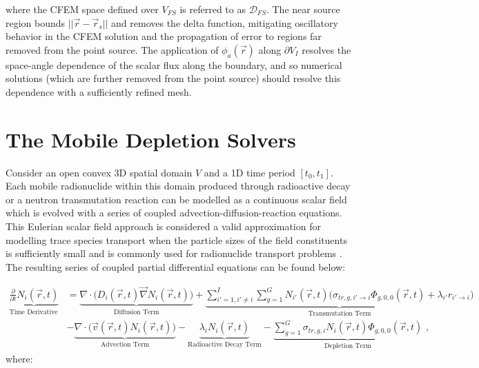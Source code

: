 where the CFEM space defined over $V_{FS}$ is referred to as $\mathcal{D}_{FS}$. The near source region bounds $||\vec{r} - \vec{r}_{s}||$ and removes the delta function, mitigating oscillatory behavior in the CFEM solution and the propagation of error to regions far removed from the point source. The application of $\phi_{a}(\vec{r})$ along $\partial V_{I}$ resolves the space-angle dependence of the scalar flux along the boundary, and so numerical solutions (which are further removed from the point source) should resolve this dependence with a sufficiently refined mesh. 

\section{The Mobile Depletion Solvers}
\label{solver:depletion}

Consider an open convex 3D spatial domain $V$ and a 1D time period $[t_{0}, t_{1}]$. Each mobile radionuclide within this domain produced through radioactive decay or a neutron transmutation reaction can be modelled as a continuous scalar field which is evolved with a series of coupled advection-diffusion-reaction equations. This Eulerian scalar field approach is considered a valid approximation for modelling trace species transport when the particle sizes of the field constituents is sufficiently small \cite{turbulent_species_transport} and is commonly used for radionuclide transport problems \cite{fusion_activation_tool_fluned,fusion_activation_demo_wcll,fusion_activation_modelling,fusion_activation_wall,griffin_pronghorn_msr}. The resulting series of coupled partial differential equations can be found below:

\begin{align}\label{eq:mobile_depletion}
    \underbrace{\frac{\partial}{\partial t}N_{i}(\vec{r},t)}_{\text{Time Derivative Term}} &=
      \underbrace{\nabla\cdot\Big(D_{i}(\vec{r},t)\vec{\nabla}N_{i}(\vec{r},t)\Big)}_{\text{Diffusion Term}}
    + \underbrace{\sum_{i' = 1,i' \neq i}^{I}\sum_{g = 1}^{G}N_{i'}(\vec{r},t)\Big(\sigma_{tr,g,i'\rightarrow i}\Phi_{g, 0, 0}(\vec{r},t)
    + \lambda_{i'}r_{i'\rightarrow i}\Big)}_{\text{Transmutation Term}}\nonumber\\
    &- \underbrace{\nabla\cdot\Big(\vec{v}(\vec{r},t)N_{i}(\vec{r},t)\Big)}_{\text{Advection Term}}
    - \underbrace{\lambda_{i}N_{i}(\vec{r},t)}_{\text{Radioactive Decay Term}}
    - \underbrace{\sum_{g = 1}^{G}\sigma_{tr,g,i}N_{i}(\vec{r},t)\Phi_{g, 0, 0}(\vec{r},t)}_{\text{Depletion Term}}
    \text{ ,}
\end{align}
where:

